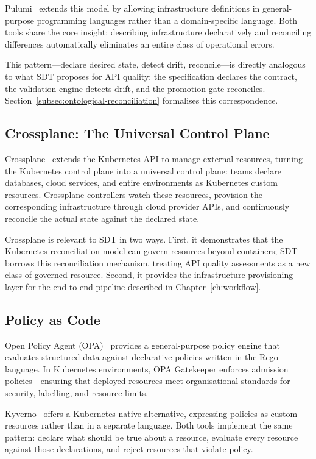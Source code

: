Pulumi~\cite{pulumi} extends this model by allowing infrastructure definitions in general-purpose programming languages rather than a domain-specific language. Both tools share the core insight: describing infrastructure declaratively and reconciling differences automatically eliminates an entire class of operational errors.

This pattern---declare desired state, detect drift, reconcile---is directly analogous to what SDT proposes for API quality: the specification declares the contract, the validation engine detects drift, and the promotion gate reconciles. Section~\ref{subsec:ontological-reconciliation} formalises this correspondence.

\subsection{Crossplane: The Universal Control Plane}
\label{subsec:crossplane}

Crossplane~\cite{crossplane} extends the Kubernetes API to manage external resources, turning the Kubernetes control plane into a universal control plane: teams declare databases, cloud services, and entire environments as Kubernetes custom resources. Crossplane controllers watch these resources, provision the corresponding infrastructure through cloud provider APIs, and continuously reconcile the actual state against the declared state.

Crossplane is relevant to SDT in two ways. First, it demonstrates that the Kubernetes reconciliation model can govern resources beyond containers; SDT borrows this reconciliation mechanism, treating API quality assessments as a new class of governed resource. Second, it provides the infrastructure provisioning layer for the end-to-end pipeline described in Chapter~\ref{ch:workflow}.

\subsection{Policy as Code}
\label{subsec:policy-as-code}

Open Policy Agent (OPA)~\cite{opa} provides a general-purpose policy engine that evaluates structured data against declarative policies written in the Rego language. In Kubernetes environments, OPA Gatekeeper enforces admission policies---ensuring that deployed resources meet organisational standards for security, labelling, and resource limits.

Kyverno~\cite{kyverno} offers a Kubernetes-native alternative, expressing policies as custom resources rather than in a separate language. Both tools implement the same pattern: declare what should be true about a resource, evaluate every resource against those declarations, and reject resources that violate policy.

